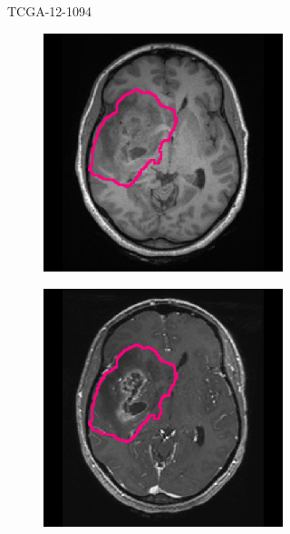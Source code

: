 \begin{subappendices}
\begin{figure}[htbp]
\begin{subfigure}[b]{0.8\textwidth}
\begin{subfigure}[b]{0.215\textwidth}
        \end{subfigure}
        \caption{TCGA-12-1094}
    \end{subfigure}
    \begin{subfigure}[b]{0.8\textwidth}
        \centering
        \hfill
        \begin{subfigure}[b]{0.215\textwidth}
        \includegraphics[width=\textwidth, clip, trim=2.5cm 0.5cm 2.5cm 0.5cm]{Figures/Random_segs/T1_TCGA-14-3477.png}
        \end{subfigure}
        \hfill
        \begin{subfigure}[b]{0.215\textwidth}
        \includegraphics[width=\textwidth, clip, trim=2.5cm 0.5cm 2.5cm 0.5cm]{Figures/Random_segs/T1GD_TCGA-14-3477.png}

\end{subfigure}
\end{subfigure}
\end{figure}
\end{subappendices}
